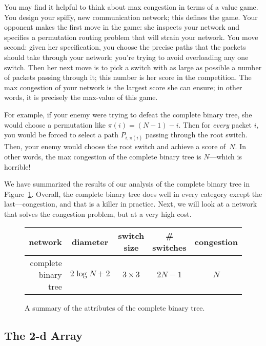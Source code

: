 You may find it helpful to think about max congestion in terms of a
value game.  You design your spiffy, new communication network; this
defines the game.  Your opponent makes the first move in the game: she
inspects your network and specifies a permutation routing problem that
will strain your network.  You move second: given her specification,
you choose the precise paths that the packets should take through your
network; you're trying to avoid overloading any one switch.  Then her
next move is to pick a switch with as large as possible a number of
packets passing through it; this number is her score in the
competition.  The max congestion of your network is the largest score
she can ensure; in other words, it is precisely the max-value of this
game.

For example, if your enemy were trying to defeat the complete binary
tree, she would choose a permutation like $\pi(i) = (N - 1) - i$.
Then for \emph{every} packet $i$, you would be forced to select a path
$P_{i, \pi(i)}$ passing through the root switch.  Then, your enemy
would choose the root switch and achieve a score of~$N$.  In other
words, the max congestion of the complete binary tree is $N$---which
is horrible!

We have summarized the results of our analysis of the complete binary
tree in Figure~\ref{fig:6EK}.  Overall, the complete binary tree does
well in every category except the last---congestion, and that is a
killer in practice.  Next, we will look at a network that solves the
congestion problem, but at a very high cost.

\begin{figure}

\begin{tabular}{r|c|c|c|c}
\textbf{network} &
\textbf{diameter} &
\textbf{switch size} &
\textbf{\# switches} &
\textbf{congestion} \\ \hline
complete binary tree & $2 \log N + 2$ & $3 \times 3$ & $2N - 1$ & $N$
\end{tabular}

\caption{A summary of the attributes of the complete binary tree.}

\label{fig:6EK}

\end{figure}

\subsection{The 2-d Array}\label{sec:2d-array}


